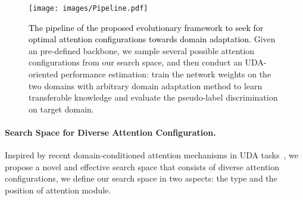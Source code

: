 \documentclass[10pt,twocolumn,letterpaper]{article}
\begin{document}
\begin{figure}
    \centering
    \texttt{[image: images/Pipeline.pdf]}
    \caption{\textcolor{black}{The pipeline of the proposed evolutionary framework to seek for optimal attention configurations towards domain adaptation.} Given an pre-defined backbone, we sample several possible attention configurations from our search space, and then conduct an UDA-oriented performance estimation: train the network weights on the two domains with arbitrary domain adaptation method to learn transferable knowledge and evaluate the pseudo-label discrimination on target domain.}
    \label{fig:Methodology}
\end{figure} \begin{table}
    \centering
    \caption{The basic element to make up various attention modules. The element can also be easily extended with other kinds of attention operations for practical usages.}
    \label{tab:TypicalAttention}
    \small{
    }
    \vspace{-4mm}
\end{table} 

\vspace{-3mm}
\paragraph{Search Space for Diverse Attention Configuration.}
Inspired by recent domain-conditioned attention mechanisms in UDA tasks~\cite{wang2019TN,li2020DCAN,wang2020DAFD}, we propose a novel and effective search space that consists of diverse attention configurations, we define our search space in two aspects: the type and the position of attention module.
\end{document}
